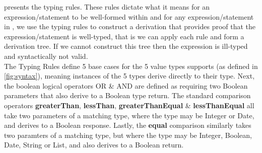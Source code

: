  presents the \thePolicyLang typing rules.
These rules dictate what it means for an expression/statement to be well-formed within \thePolicyLang and for any expression/statement in \thePolicyLang, we use the typing rules to construct a derivation that provides proof that the expression/statement is well-typed, that is we can apply each rule and form a derivation tree. If we cannot construct this tree then the expression is ill-typed and syntactically not valid.\\
The Typing Rules define 5 base cases for the 5 value types \thePolicyLang supports (as defined in \cref{fig:syntax}), meaning instances of the 5 types derive directly to their type. Next, the boolean logical operators OR \& AND are defined as requiring two Boolean parameters that also derive to a Boolean type return. The standard comparison operators \textbf{greaterThan}, \textbf{lessThan}, \textbf{greaterThanEqual} \& \textbf{lessThanEqual} all take two parameters of a matching type, where the type may be Integer or Date, and derives to a Boolean response. Lastly, the \textbf{equal} comparison similarly takes two paramters of a matching type, but where the type may be Integer, Boolean, Date, String or List, and also derives to a Boolean return.
